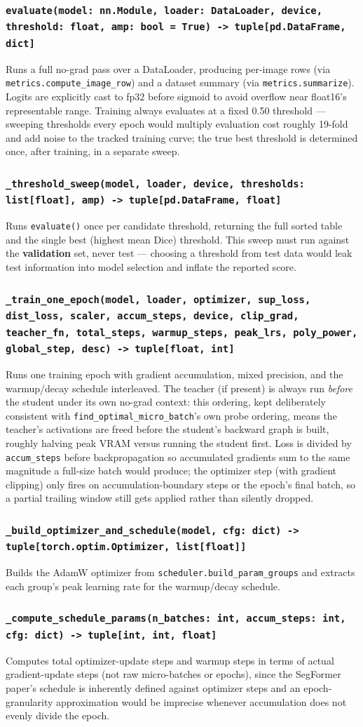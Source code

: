 \documentclass[11pt]{article}
\newcommand{\func}[1]{\subsubsection*{\texttt{#1}}}
\begin{document}
\func{evaluate(model: nn.Module, loader: DataLoader, device, threshold: float, amp: bool = True) -> tuple[pd.DataFrame, dict]}
Runs a full no-grad pass over a DataLoader, producing per-image rows (via
\texttt{metrics.compute\_image\_row}) and a dataset summary (via
\texttt{metrics.summarize}). Logits are explicitly cast to fp32 before sigmoid
to avoid overflow near float16's representable range. Training always evaluates
at a fixed 0.50 threshold --- sweeping thresholds every epoch would multiply
evaluation cost roughly 19-fold and add noise to the tracked training curve; the
true best threshold is determined once, after training, in a separate sweep.

\func{\_threshold\_sweep(model, loader, device, thresholds: list[float], amp) -> tuple[pd.DataFrame, float]}
Runs \texttt{evaluate()} once per candidate threshold, returning the full sorted
table and the single best (highest mean Dice) threshold. This sweep must run
against the \textbf{validation} set, never test --- choosing a threshold from
test data would leak test information into model selection and inflate the
reported score.

\func{\_train\_one\_epoch(model, loader, optimizer, sup\_loss, dist\_loss, scaler, accum\_steps, device, clip\_grad, teacher\_fn, total\_steps, warmup\_steps, peak\_lrs, poly\_power, global\_step, desc) -> tuple[float, int]}
Runs one training epoch with gradient accumulation, mixed precision, and the
warmup/decay schedule interleaved. The teacher (if present) is always run
\emph{before} the student under its own no-grad context: this ordering, kept
deliberately consistent with \texttt{find\_optimal\_micro\_batch}'s own probe
ordering, means the teacher's activations are freed before the student's
backward graph is built, roughly halving peak VRAM versus running the student
first. Loss is divided by \texttt{accum\_steps} before backpropagation so
accumulated gradients sum to the same magnitude a full-size batch would
produce; the optimizer step (with gradient clipping) only fires on
accumulation-boundary steps or the epoch's final batch, so a partial trailing
window still gets applied rather than silently dropped.

\func{\_build\_optimizer\_and\_schedule(model, cfg: dict) -> tuple[torch.optim.Optimizer, list[float]]}
Builds the AdamW optimizer from \texttt{scheduler.build\_param\_groups} and
extracts each group's peak learning rate for the warmup/decay schedule.

\func{\_compute\_schedule\_params(n\_batches: int, accum\_steps: int, cfg: dict) -> tuple[int, int, float]}
Computes total optimizer-update steps and warmup steps in terms of actual
gradient-update steps (not raw micro-batches or epochs), since the SegFormer
paper's schedule is inherently defined against optimizer steps and an
epoch-granularity approximation would be imprecise whenever accumulation does
not evenly divide the epoch.
\end{document}
